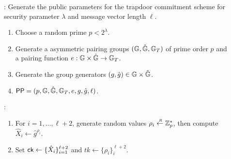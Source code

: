 \begin{description}
\item[]: Generate the public parameters for the trapdoor commitment scheme for security parameter $\lambda$ and message vector length $\ell$. 
  \begin{enumerate}
  \item Choose a random prime $p< 2^{\lambda}$.
  \item Generate a asymmetric pairing groups $(\mathbb{G}, \hat{\mathbb{G}}, \mathbb{G}_T)$ of prime order $p$ and a pairing function $e : \mathbb{G} \times \hat{\mathbb{G}} \to \mathbb{G}_T$.
  \item Generate the group generators $(g, \hat{g}) \in \mathbb{G} \times \hat{\mathbb{G}}$.	
  \item $\mathsf{PP} = (p, \mathbb{G}, \hat{\mathbb{G}}, \mathbb{G}_T, e, g, \hat{g},\ell)$.
  \end{enumerate}

\item[]:
  \begin{enumerate}
  \item For $i = 1, \dots, \ell+2$, generate random values $\rho_i \stackrel{{\scriptscriptstyle \mkern4mu R}}{\gets} \mathbb{Z}_p^*$, then compute $\hat{X}_i \gets \hat{g}^{\rho_i}$.
  \item Set $\mathsf{ck} \gets \{\hat{X}_i\}_{i = 1}^{\ell+2}$ and $tk \gets \{\rho_i\}_i^{\ell+2}$.
  \end{enumerate}



\end{description}
